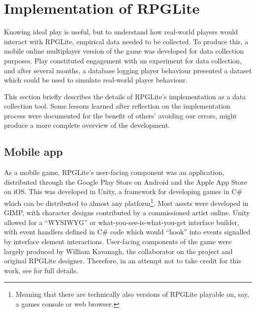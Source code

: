 
\section{Implementation of RPGLite}

Knowing ideal play is useful, but to understand how real-world players would
interact with RPGLite, empirical data needed to be collected. To produce this,
a mobile online multiplayer version of the game was developed for data collection purposes. Play constituted
engagement with an experiment for data collection, and after several months, a
database logging player behaviour presented a dataset which could be used to simulate real-world player behaviour.

This section briefly describes the details of RPGLite's implementation as a data
collection tool. Some lessons learned after reflection on the implementation
process were documented for the benefit of others' avoiding our
errors\cite{RPGLiteLessonsLearned}, might produce a more complete overview of
the development.

\subsection{Mobile app}

As a mobile game, RPGLite's user-facing component was an application,
distributed through the Google Play Store on Android and the Apple App Store on
iOS. This was developed in Unity, a framework for developing games in C\# which
can be distributed to almost any platform\footnote{Meaning that there are
technically also versions of RPGLite playable on, say, a games console or web
browser.}. Most assets were developed in GIMP, with character designs
contributed by a commissioned artist online. Unity allowed for a ``WYSIWYG''
or what-you-see-is-what-you-get interface builder, with event handlers defined
in C\# code which would ``hook'' into events signalled by interface element
interactions. User-facing components of the game were largely produced by
William Kavanagh, the collaborator on the project and original RPGLite designer.
Therefore, in an attempt not to take credit for this work, see  for full details.

